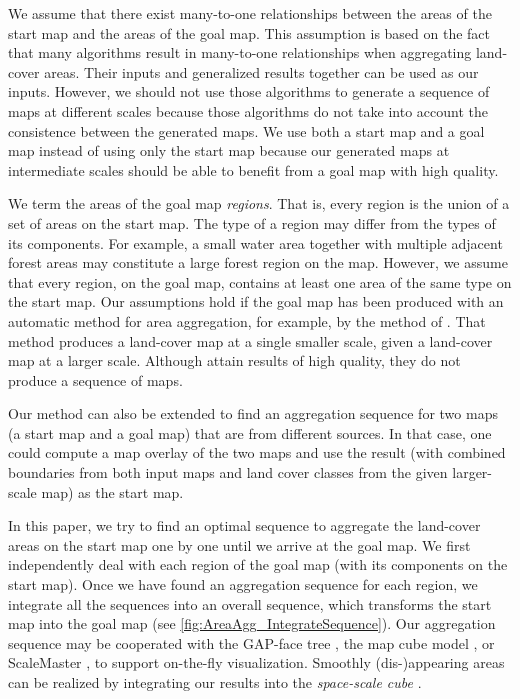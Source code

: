 \documentclass[acmsmall,natbib=false]{acmart}
\begin{document}
We assume that there exist many-to-one relationships 
between the areas of the start map and the areas of the goal map.
This assumption is based on the fact that many algorithms 
\parencite[e.g.,][]{HaunertWolff2010AreaAgg,
vanSmaalen2003,Oehrlein2017Aggregation}
result in many-to-one relationships
when aggregating land-cover areas.
Their inputs and generalized results together
can be used as our inputs.
However, we should not use those algorithms
to generate a sequence of maps at different scales
because those algorithms do not take into account 
the consistence between the generated maps.
We use both a start map and a goal map instead of using only the start map
because our generated maps at intermediate scales should be able to
benefit from a goal map with high quality.

We term the areas of the goal map \emph{regions}.
That is, every region is the union of a set of areas 
on the start map.
The type of a region may differ from the types of its components. 
For example, a small water area together with 
multiple adjacent forest areas may constitute 
a large forest region on the  map.
However, we assume that every region, on the goal map, 
contains at least one area of the same type on the start map.
Our assumptions hold if the goal map has been produced 
with an automatic method for area aggregation, 
for example, by the method of \citet{HaunertWolff2010AreaAgg}.
That method produces a land-cover map at a single smaller scale, 
given a land-cover map at a larger scale.
Although \textcite{HaunertWolff2010AreaAgg}
attain results of high quality, 
they do not produce a sequence of maps.

Our method can also be extended to find an aggregation sequence 
for two maps (a start map and a goal map) that are from different sources.
In that case, one could compute a map overlay of the two maps
and use the result 
(with combined boundaries from both input maps and land cover classes 
from the given larger-scale map) 
as the start map.

In this paper, we try to find an optimal sequence
to aggregate the land-cover areas on the start map
one by one until we arrive at the goal map.
We first independently deal with each region of the goal map 
(with its components on the start map).
Once we have found an aggregation sequence for each region, 
we integrate all the sequences into an overall sequence,
which transforms the start map into the goal map
(see \fig\ref{fig:AreaAgg_IntegrateSequence}). 
Our aggregation sequence may be cooperated with
the GAP-face tree \citep{vanOosterom2005},
the map cube model \citep{Timpf1998},
or ScaleMaster \citep{Brewer2007Guidelines,Touya2013ScaleMaster}, 
to support on-the-fly visualization.
Smoothly (dis-)appearing areas can be realized
by integrating our results into the \emph{space-scale cube}
\parencite{vanOosterom2014Support,vanOosterom2014tGAPSSC}.
\end{document}
